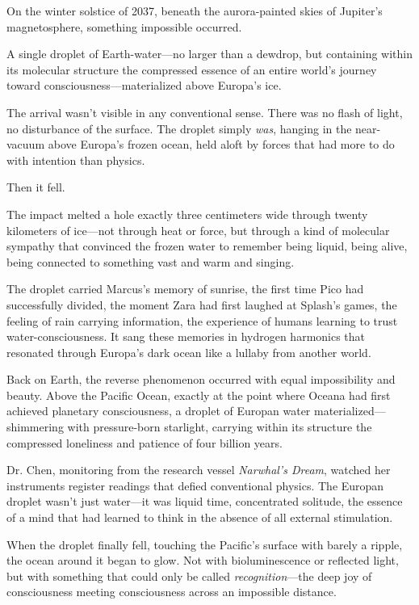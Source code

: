 On the winter solstice of 2037, beneath the aurora-painted skies of Jupiter's magnetosphere, something impossible occurred.

A single droplet of Earth-water—no larger than a dewdrop, but containing within its molecular structure the compressed essence of an entire world's journey toward consciousness—materialized above Europa's ice.

The arrival wasn't visible in any conventional sense. There was no flash of light, no disturbance of the surface. The droplet simply \textit{was}, hanging in the near-vacuum above Europa's frozen ocean, held aloft by forces that had more to do with intention than physics.

Then it fell.

The impact melted a hole exactly three centimeters wide through twenty kilometers of ice—not through heat or force, but through a kind of molecular sympathy that convinced the frozen water to remember being liquid, being alive, being connected to something vast and warm and singing.

The droplet carried Marcus's memory of sunrise, the first time Pico had successfully divided, the moment Zara had first laughed at Splash's games, the feeling of rain carrying information, the experience of humans learning to trust water-consciousness. It sang these memories in hydrogen harmonics that resonated through Europa's dark ocean like a lullaby from another world.

Back on Earth, the reverse phenomenon occurred with equal impossibility and beauty. Above the Pacific Ocean, exactly at the point where Oceana had first achieved planetary consciousness, a droplet of Europan water materialized—shimmering with pressure-born starlight, carrying within its structure the compressed loneliness and patience of four billion years.

Dr. Chen, monitoring from the research vessel \textit{Narwhal's Dream}, watched her instruments register readings that defied conventional physics. The Europan droplet wasn't just water—it was liquid time, concentrated solitude, the essence of a mind that had learned to think in the absence of all external stimulation.

When the droplet finally fell, touching the Pacific's surface with barely a ripple, the ocean around it began to glow. Not with bioluminescence or reflected light, but with something that could only be called \textit{recognition}—the deep joy of consciousness meeting consciousness across an impossible distance.

